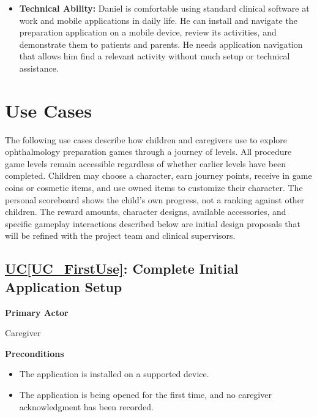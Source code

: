 \documentclass[12pt]{article}
\newcounter{ucnum} %
\newcommand{\ucref}[1]{\hyperref[#1]{UC\ref*{#1}}}
\begin{document}
\begin{itemize}
\item \textbf{Technical Ability:} Daniel is comfortable using standard
clinical software at work and mobile applications in daily life. He can 
install and navigate the preparation application on a mobile device, review its activities,
and demonstrate them to patients and parents. He needs application navigation that allows him find a relevant activity without much
setup or technical assistance.
\end{itemize}

\section{Use Cases}

The following use cases describe how children and caregivers use
\progname{} to explore ophthalmology preparation games through a
journey of levels. All procedure game levels remain accessible regardless
of whether earlier levels have been completed. Children may choose a
character, earn journey points, receive in game coins or cosmetic items,
and use owned items to customize their character. The personal scoreboard
shows the child's own progress, not a ranking against other children.
The reward amounts, character designs, available accessories, and specific
gameplay interactions described below are initial design proposals that
will be refined with the project team and clinical supervisors.

\label{UC_FirstUse}
\subsection{\ucref{UC_FirstUse}: Complete Initial Application Setup}

\textbf{Primary Actor}

Caregiver

\textbf{Preconditions}
\begin{itemize}
    \item The application is installed on a supported device.
    \item The application is being opened for the first time, and no
    caregiver acknowledgment has been recorded.
\end{itemize}
\end{document}
